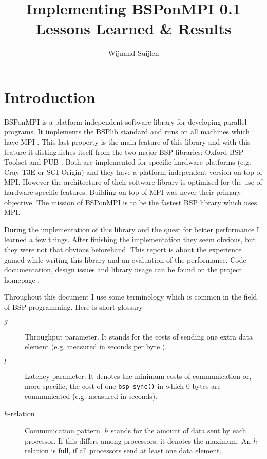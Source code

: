 \documentclass[a4paper]{article}
\title{Implementing BSPonMPI 0.1 \\ Lessons Learned \& Results}
\author{Wijnand Suijlen}
\begin{document}
\maketitle{}


\section{Introduction}
BSPonMPI is a platform independent software library for developing parallel
programs. It implements the BSPlib standard \cite{bsplib}
and runs on all machines which have MPI \cite{mpi}. This last property is the
main feature of this library and with this feature it distinguishes itself
from the two major BSP libraries: Oxford BSP Toolset \cite{oxtool} and PUB
\cite{pub}.  Both are implemented for specific hardware platforms (e.g. Cray
T3E or SGI Origin) and they have a platform independent version on top
of MPI.  However the architecture of their software library is optimised for
the use of hardware specific features. Building on top of MPI was never their
primary objective. The mission of BSPonMPI is to be the fastest BSP library
which uses MPI.

During the implementation of this library and the quest for better performance
I learned a few things. After finishing the implementation they seem obvious,
but they were not that obvious beforehand.  This report is about the
experience gained while writing this library and an evaluation of the
performance.  Code documentation, design issues and library usage can be found
on the project homepage
\cite{homepage}. 

Throughout this document I use some terminology which is common in the field
of BSP programming. Here is short glossary
\begin{description}
\item[$g$] Throughput parameter. It stands for the costs of sending one extra
data element (e.g. measured in seconds per byte ).
\item[$l$] Latency parameter. It denotes the minimum costs of communication
or, more specific, the cost of one \verb|bsp_sync()| in which $0$ bytes are
communicated (e.g. measured in seconds).
\item[$h$-relation] Communication pattern. $h$ stands for the amount
of data sent by each processor. If this differs among processors, it denotes
the maximum. An $h$-relation is full, if all processors send at least one data
element. 
\end{description}
\end{document}
